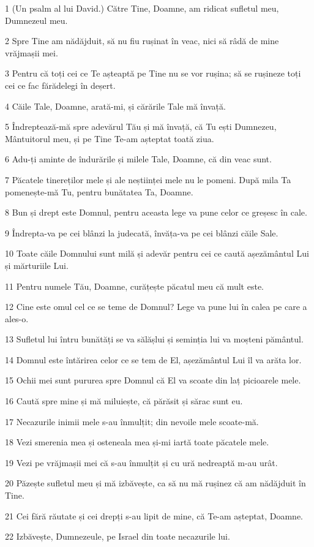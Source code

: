 \par 1 (Un psalm al lui David.) Către Tine, Doamne, am ridicat sufletul meu, Dumnezeul meu.
\par 2 Spre Tine am nădăjduit, să nu fiu rușinat în veac, nici să râdă de mine vrăjmașii mei.
\par 3 Pentru că toți cei ce Te așteaptă pe Tine nu se vor rușina; să se rușineze toți cei ce fac fărădelegi în deșert.
\par 4 Căile Tale, Doamne, arată-mi, și cărările Tale mă învață.
\par 5 Îndreptează-mă spre adevărul Tău și mă învață, că Tu ești Dumnezeu, Mântuitorul meu, și pe Tine Te-am așteptat toată ziua.
\par 6 Adu-ți aminte de îndurările și milele Tale, Doamne, că din veac sunt.
\par 7 Păcatele tinereților mele și ale neștiinței mele nu le pomeni. După mila Ta pomenește-mă Tu, pentru bunătatea Ta, Doamne.
\par 8 Bun și drept este Domnul, pentru aceasta lege va pune celor ce greșesc în cale.
\par 9 Îndrepta-va pe cei blânzi la judecată, învăța-va pe cei blânzi căile Sale.
\par 10 Toate căile Domnului sunt milă și adevăr pentru cei ce caută așezământul Lui și mărturiile Lui.
\par 11 Pentru numele Tău, Doamne, curățește păcatul meu că mult este.
\par 12 Cine este omul cel ce se teme de Domnul? Lege va pune lui în calea pe care a ales-o.
\par 13 Sufletul lui întru bunătăți se va sălășlui și seminția lui va moșteni pământul.
\par 14 Domnul este întărirea celor ce se tem de El, așezământul Lui îl va arăta lor.
\par 15 Ochii mei sunt pururea spre Domnul că El va scoate din laț picioarele mele.
\par 16 Caută spre mine și mă miluiește, că părăsit și sărac sunt eu.
\par 17 Necazurile inimii mele s-au înmulțit; din nevoile mele scoate-mă.
\par 18 Vezi smerenia mea și osteneala mea și-mi iartă toate păcatele mele.
\par 19 Vezi pe vrăjmașii mei că s-au înmulțit și cu ură nedreaptă m-au urât.
\par 20 Păzește sufletul meu și mă izbăvește, ca să nu mă rușinez că am nădăjduit în Tine.
\par 21 Cei fără răutate și cei drepți s-au lipit de mine, că Te-am așteptat, Doamne.
\par 22 Izbăvește, Dumnezeule, pe Israel din toate necazurile lui.

